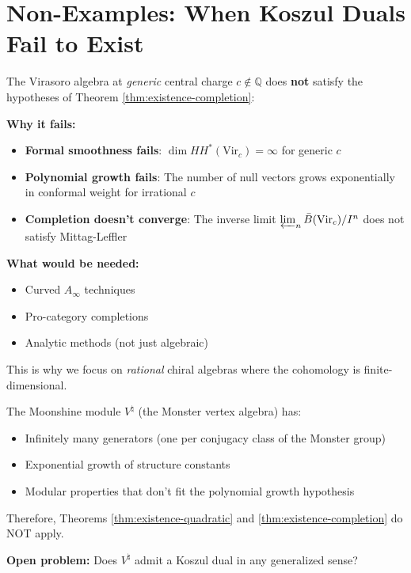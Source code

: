 \section{Non-Examples: When Koszul Duals Fail to Exist}

\begin{remark}
\label{rem:virasoro-generic-fails}
The Virasoro algebra at \textit{generic} central charge $c \notin \mathbb{Q}$ does \textbf{not} satisfy the hypotheses of Theorem \ref{thm:existence-completion}:

\textbf{Why it fails:}
\begin{itemize}
\item \textbf{Formal smoothness fails}: $\dim HH^*(\text{Vir}_c) = \infty$ for generic $c$
\item \textbf{Polynomial growth fails}: The number of null vectors grows exponentially in conformal weight for irrational $c$
\item \textbf{Completion doesn't converge}: The inverse limit $\varprojlim_n \bar{B}(\text{Vir}_c)/I^n$ does not satisfy Mittag-Leffler
\end{itemize}

\textbf{What would be needed:}
\begin{itemize}
\item Curved $A_\infty$ techniques
\item Pro-category completions
\item Analytic methods (not just algebraic)
\end{itemize}

This is why we focus on \textit{rational} chiral algebras where the cohomology is finite-dimensional.
\end{remark}

\begin{remark}
The Moonshine module $V^\natural$ (the Monster vertex algebra) has:
\begin{itemize}
\item Infinitely many generators (one per conjugacy class of the Monster group)
\item Exponential growth of structure constants
\item Modular properties that don't fit the polynomial growth hypothesis
\end{itemize}

Therefore, Theorems \ref{thm:existence-quadratic} and \ref{thm:existence-completion} do NOT apply.

\textbf{Open problem:} Does $V^\natural$ admit a Koszul dual in any generalized sense?
\end{remark}

